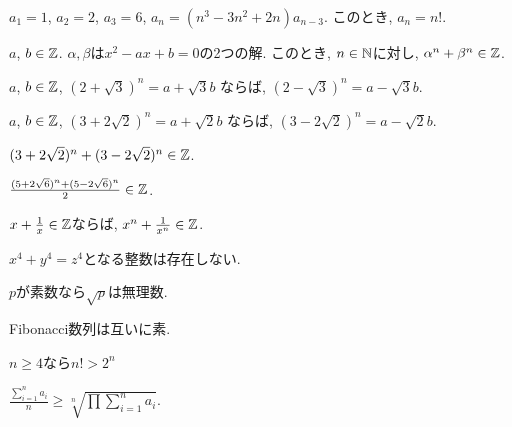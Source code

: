\begin{prop}
  $a_1=1$, $a_2=2$, $a_3=6$,
  $a_n=(n^3-3n^2+2n)a_{n-3}$.
  このとき, $a_n=n!$.
\end{prop}



\begin{prop}
  $a$, $b\in\mathbb{Z}$.
  $\alpha, \beta$は$x^2-ax+b=0$の2つの解.
  このとき, $n\in\mathbb{N}$に対し,
  $\alpha^n+\beta^n\in \mathbb{Z}$.
\end{prop}

\begin{prop}
  $a$, $b\in\mathbb{Z}$,  
  $(2+\sqrt{3})^n=a+\sqrt{3}b$
  ならば,
  $(2-\sqrt{3})^n=a-\sqrt{3}b$.
\end{prop}

\begin{prop}
  $a$, $b\in\mathbb{Z}$,  
  $(3+2\sqrt{2})^n=a+\sqrt{2}b$
  ならば,
  $(3-2\sqrt{2})^n=a-\sqrt{2}b$.
\end{prop}


\begin{prop}
  $(3+2\sqrt{2})^n+(3-2\sqrt{2})^n\in\mathbb{Z}$.
\end{prop}

\begin{prop}
  $\frac{(5+2\sqrt{6})^n+(5-2\sqrt{6})^n}{2}\in\mathbb{Z}$.
\end{prop}

\begin{prop}
  $x+\frac{1}{x}\in\mathbb{Z}$ならば, 
  $x^n+\frac{1}{x^n}\in\mathbb{Z}$.
\end{prop}


\begin{prop}
  $x^4+y^4=z^4$となる整数は存在しない.
\end{prop}

\begin{prop}
  $p$が素数なら$\sqrt{p}$は無理数.
\end{prop}

\begin{prop}
  Fibonacci数列は互いに素.
\end{prop}



\begin{prop}
  $n\geq 4$なら$n!>2^n$
\end{prop}



\begin{prop}
  $\frac{\sum_{i=1}^n a_i}{n} \geq \sqrt[n]{\prod\sum_{i=1}^n a_i}$.
\end{prop}


